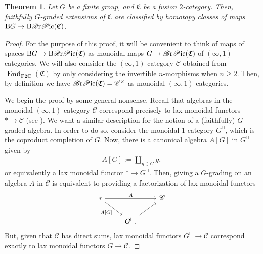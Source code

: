 \documentclass[pdftex]{sigma}
\newtheorem{Theorem}{Theorem}[section]
\numberwithin{equation}{section}
\begin{document}
\begin{Theorem}\label{thm:extensiontheory}
Let $G$ be a finite group, and $\mathfrak{C}$ be a fusion $2$-category. Then, faithfully $G$-graded extensions of $\mathfrak{C}$ are classified by homotopy classes of maps $\mathrm{B}G\rightarrow \mathrm{B}\mathscr{B}{\rm r}\mathscr{P}{\rm ic}(\mathfrak{C})$.
\end{Theorem}
\begin{proof}
For the purpose of this proof, it will be convenient to think of maps of spaces $\mathrm{B}G\rightarrow \mathrm{B}\mathscr{B}{\rm r}\mathscr{P}{\rm ic}(\mathfrak{C})$ as monoidal maps $G\rightarrow \mathscr{B}{\rm r}\mathscr{P}{\rm ic}(\mathfrak{C})$ of $(\infty,1)$-categories. We will also consider the $(\infty,1)$-category $\mathscr{C}$ obtained from $\mathbf{\operatorname{End}}_{\mathbf{F2C}}(\mathfrak{C})$ by only considering the invertible $n$-morphisms when $n\geq 2$. Then, by definition we have $\mathscr{B}{\rm r}\mathscr{P}{\rm ic}(\mathfrak{C})=\mathscr{C}^{\times}$ as monoidal $(\infty,1)$-categories.

We begin the proof by some general nonsense. Recall that algebras in the monoidal $(\infty,1)$-category $\mathscr{C}$ correspond precisely to lax monoidal functors $*\rightarrow \mathscr{C}$ (see \cite[Example~2.2.6.10]{L2}). We want a similar description for the notion of a (faithfully) $G$-graded algebra. In order to do so, consider the monoidal 1-category $G^{\sqcup}$, which is the coproduct completion of $G$. Now, there is a canonical algebra $A[G]$ in $G^{\sqcup}$ given by
 \begin{gather*}
A[G]:=\coprod_{g\in G}g,
\end{gather*}
 or equivalently a lax monoidal functor $*\rightarrow G^{\sqcup}$. Then, giving a $G$-grading on an algebra $A$ in $\mathscr{C}$ is equivalent to providing a factorization of lax monoidal functors
\begin{displaymath}
\begin{tikzcd}
* \arrow[rr,"A"] \arrow[rd, "A\lbrack G \rbrack"'] & & \mathscr{C} \\
 & G^{\sqcup}. \arrow[ru] &
\end{tikzcd}\end{displaymath}
But, given that $\mathscr{C}$ has direct sums, lax monoidal functors $G^{\sqcup}\rightarrow \mathscr{C}$ correspond exactly to lax monoidal functors $G\rightarrow \mathscr{C}$.


\end{proof}
\end{document}
